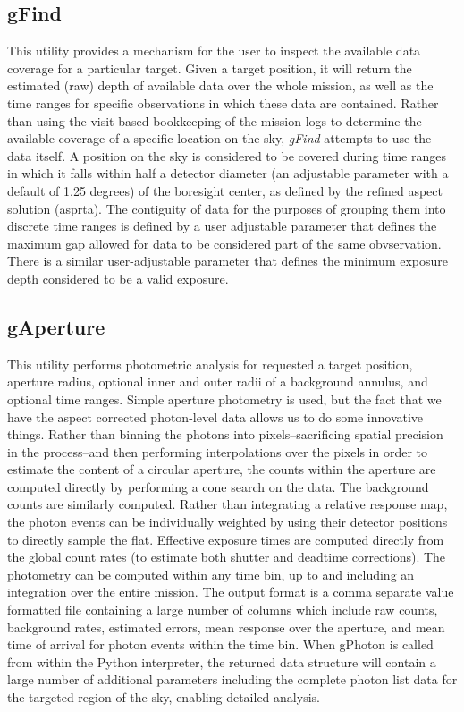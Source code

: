 \documentclass[preprint]{aastex}
\begin{document}
\subsection{gFind}
This utility provides a mechanism for the user to inspect the available data coverage for a particular target. Given a target position, it will return the estimated (raw) depth of available data over the whole mission, as well as the time ranges for specific observations in which these data are contained. Rather than using the visit-based bookkeeping of the mission logs to determine the available coverage of a specific location on the sky, \textit{gFind} attempts to use the data itself. A position on the sky is considered to be covered during time ranges in which it falls within half a detector diameter (an adjustable parameter with a default of 1.25 degrees) of the boresight center, as defined by the refined aspect solution (asprta). The contiguity of data for the purposes of grouping them into discrete time ranges is defined by a user adjustable parameter that defines the maximum gap allowed for data to be considered part of the same obvservation. There is a similar user-adjustable parameter that defines the minimum exposure depth considered to be a valid exposure.

\subsection{gAperture}
This utility performs photometric analysis for requested a target position, aperture radius, optional inner and outer radii of a background annulus, and optional time ranges. Simple aperture photometry is used, but the fact that we have the aspect corrected photon-level data allows us to do some innovative things. Rather than binning the photons into pixels--sacrificing spatial precision in the process--and then performing interpolations over the pixels in order to estimate the content of a circular aperture, the counts within the aperture are computed directly by performing a cone search on the data. The background counts are similarly computed. Rather than integrating a relative response map, the photon events can be individually weighted by using their detector positions to directly sample the flat. Effective exposure times are computed directly from the global count rates (to estimate both shutter and deadtime corrections). The photometry can be computed within any time bin, up to and including an integration over the entire mission. The output format is a comma separate value formatted file containing a large number of columns which include raw counts, background rates, estimated errors, mean response over the aperture, and mean time of arrival for photon events within the time bin. When gPhoton is called from within the Python interpreter, the returned data structure will contain a large number of additional parameters including the complete photon list data for the targeted region of the sky, enabling detailed analysis.
\end{document}
